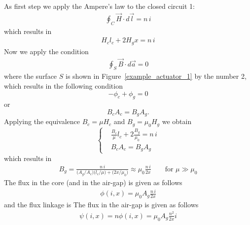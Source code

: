 \documentclass[12pt,a4paper,oneside]{book}
\begin{document}
\begin{onehalfspace}
\begin{example}
As first step we apply the Ampere's law to the closed circuit 1:
\begin{equation}\label{example_1}	
		\begin{aligned}
		\oint_{C}\vec{H}\cdot d\vec{l}=n\,i
		\end{aligned}
\end{equation} 
which results in 
\begin{equation}\label{example_2}	
	\begin{aligned}
H_cl_c+2H_gx=n\,i
	\end{aligned}
\end{equation} 
Now we apply the condition
\begin{equation}\label{example_3}	
	\begin{aligned}
		\oint_{S}\vec{B}\cdot d\vec{a}=0 %
	\end{aligned}
\end{equation} 
where the surface $S$ is shown in Figure~\ref{example_actuator_1} by the number 2, which results in the following condition $$ -\phi_c+\phi_g=0$$ or $$B_cA_c=B_gA_g. $$ Applying the equivalence $B_c=\mu H_c$ and $B_g=\mu_0 H_g$ we obtain 
\begin{equation}\label{example_4}	
	\left\lbrace 
	\begin{aligned}
		&\frac{B_c}{\mu}l_c+2\frac{B_g}{\mu_0}=n\,i \\[8pt]
		&B_cA_c=B_gA_g
	\end{aligned}
	\right. 
\end{equation} 
which results in
\begin{equation}\label{example_5}	
	\begin{aligned}
		B_g = \frac{n\,i}{\big(A_g/A_c\big)\big(l_c/\mu\big) + \big(2x/\mu_0\big)}\approx\mu_0\frac{n\,i}{2x} \qquad\text{for }\mu\gg\mu_0
	\end{aligned}
\end{equation} 
The flux in the core (and in the air-gap) is given as follows
\begin{equation}\label{example_6}	
	\begin{aligned}
		\phi\left(i,x\right) = \mu_0A_g\frac{n\,i}{2x} 
	\end{aligned}
\end{equation} 
and the flux linkage is 
The flux in the air-gap is given as follows
\begin{equation}\label{example_7}	
	\begin{aligned}
		\psi\left(i,x\right) = n\phi\left(i,x\right) = \mu_0A_g\frac{n^2}{2x}i 

\end{aligned}
\end{equation}
\end{example}
\end{onehalfspace}
\end{document}
